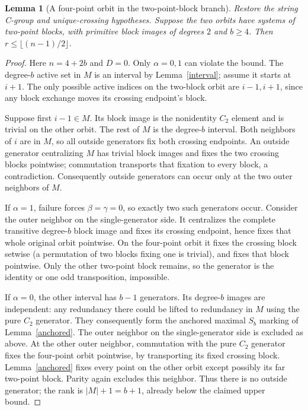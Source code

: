 \documentclass[11pt,a4paper]{article}
\newtheorem{lemma}{Lemma}
\begin{document}
\begin{lemma}[A four-point orbit in the two-point-block branch]\label{fourpoint}
Restore the string C-group and unique-crossing hypotheses.
Suppose the two orbits have systems of two-point blocks, with
primitive block images of degrees $2$ and $b\geq4$. Then
$r\leq\lfloor(n-1)/2\rfloor$.
\end{lemma}
\begin{proof}
Here $n=4+2b$ and $D=0$. Only $\alpha=0,1$ can violate the
bound. The degree-$b$ active set in $M$ is an interval by
Lemma~\ref{interval}; assume it starts at $i+1$. The only
possible active indices on the two-block orbit are $i-1,i+1$,
since any block exchange moves its crossing endpoint's block.

Suppose first $i-1\in M$. Its block image is the nonidentity
$C_2$ element and is trivial on the other orbit. The rest of
$M$ is the degree-$b$ interval. Both neighbors of $i$ are in
$M$, so all outside generators fix both crossing endpoints.
An outside generator centralizing $M$ has trivial block images
and fixes the two crossing blocks pointwise; commutation
transports that fixation to every block, a contradiction.
Consequently outside generators can occur only at the two
outer neighbors of $M$.

If $\alpha=1$, failure forces $\beta=\gamma=0$, so exactly
two such generators occur. Consider the outer neighbor on the
single-generator side. It centralizes the complete transitive
degree-$b$ block image and fixes its crossing endpoint, hence
fixes that whole original orbit pointwise. On the four-point
orbit it fixes the crossing block setwise (a permutation of two
blocks fixing one is trivial), and fixes that block pointwise.
Only the other two-point block remains, so the generator is
the identity or one odd transposition, impossible.

If $\alpha=0$, the other interval has $b-1$ generators. Its
degree-$b$ images are independent: any redundancy there could
be lifted to redundancy in $M$ using the pure $C_2$ generator.
They consequently form the anchored maximal $S_b$ marking
of Lemma~\ref{anchored}. The outer neighbor on the single-generator
side is excluded as above. At the other outer neighbor,
commutation with the pure $C_2$ generator fixes the four-point
orbit pointwise, by transporting its fixed crossing block.
Lemma~\ref{anchored} fixes every point on the other orbit
except possibly its far two-point block. Parity again excludes
this neighbor. Thus there is no outside generator; the rank
is $|M|+1=b+1$, already below the claimed upper bound.


\end{proof}
\end{document}

